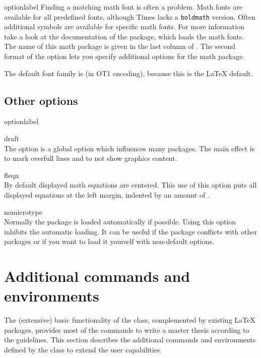 \begin{labelled}{optionlabel}
  Finding a matching math font is often a problem. Math fonts are available
  for all predefined fonts, although Times lacks a \texttt{boldmath}
  version. Often additional symbols are available for specific math fonts.
  For more information take a look at the documentation of the package,
  which loads the math fonts. The name of this math package is given in the
  last column of . The second format of the 
  option lets you specify additional options  for the math
  package.

  The default font family is  (in \textsf{OT1} encoding), because
  this is the LaTeX default.
\end{labelled}


\subsection{Other options}
\begin{labelled}{optionlabel}
\item[draft]\\
  The  option is a global option which influences many packages.
  The main effect is to mark overfull lines and to not show graphics content.

\item[fleqn]\\
  By default displayed math equations are centered. This use of this option
  puts all displayed equations at the left margin, indented by an amount of
  .

\item[nomicrotype]\label{opt:nomicrotype}
  \\
  Normally the  package is loaded automatically if possible.
  Using this option inhibits the automatic loading. It can be useful if the
  package conflicts with other packages or if you want to load it yourself
  with non-default options.
\end{labelled}

\section{Additional commands and environments}
The (extensive) basic functionality of the  class, complemented
by existing LaTeX packages, provides most of the commands to write a master
thesis according to the guidelines. This section describes the additional
commands and environments defined by the  class to extend the
user capabilities.

